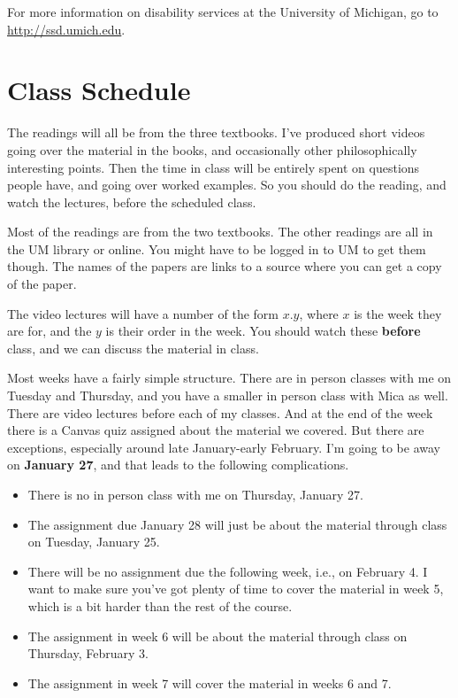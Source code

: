 \documentclass[
]{article}
\providecommand{\tightlist}{%
  \setlength{\itemsep}{0pt}\setlength{\parskip}{0pt}}
\begin{document}
For more information on disability services at the University of
Michigan, go to \url{http://ssd.umich.edu}.

\newpage

\hypertarget{class-schedule}{%
\section{Class Schedule}\label{class-schedule}}

The readings will all be from the three textbooks. I've produced short
videos going over the material in the books, and occasionally other
philosophically interesting points. Then the time in class will be
entirely spent on questions people have, and going over worked examples.
So you should do the reading, and watch the lectures, before the
scheduled class.

Most of the readings are from the two textbooks. The other readings are
all in the UM library or online. You might have to be logged in to UM to
get them though. The names of the papers are links to a source where you
can get a copy of the paper.

The video lectures will have a number of the form \(x.y\), where \(x\)
is the week they are for, and the \(y\) is their order in the week. You
should watch these \textbf{before} class, and we can discuss the
material in class.

Most weeks have a fairly simple structure. There are in person classes
with me on Tuesday and Thursday, and you have a smaller in person class
with Mica as well. There are video lectures before each of my classes.
And at the end of the week there is a Canvas quiz assigned about the
material we covered. But there are exceptions, especially around late
January-early February. I'm going to be away on \textbf{January 27}, and
that leads to the following complications.

\begin{itemize}
\tightlist
\item
  There is no in person class with me on Thursday, January 27.
\item
  The assignment due January 28 will just be about the material through
  class on Tuesday, January 25.
\item
  There will be no assignment due the following week, i.e., on February
  4. I want to make sure you've got plenty of time to cover the material
  in week 5, which is a bit harder than the rest of the course.
\item
  The assignment in week 6 will be about the material through class on
  Thursday, February 3.
\item
  The assignment in week 7 will cover the material in weeks 6 and 7.
\end{itemize}
\end{document}
